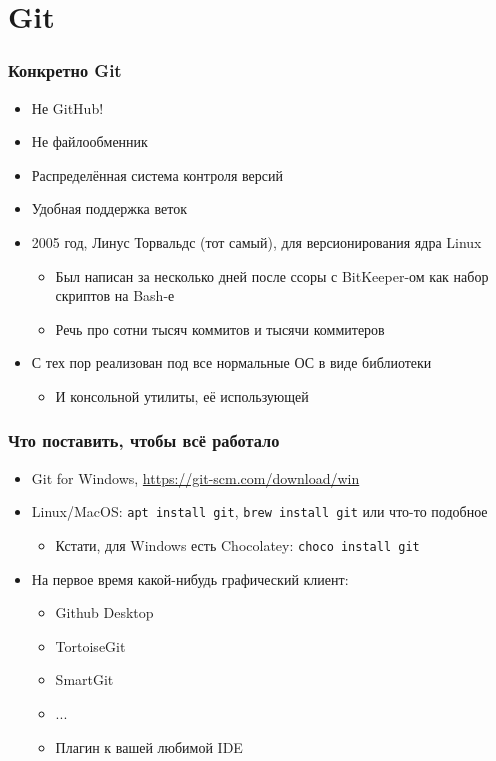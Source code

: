 \documentclass{../slides-style}
\begin{document}
    \section{Git}

    \begin{frame}
        \frametitle{Конкретно Git}
        \begin{itemize}
            \item Не GitHub!
            \item Не файлообменник
            \item Распределённая система контроля версий
            \item Удобная поддержка веток
            \item 2005 год, Линус Торвальдс (тот самый), для версионирования ядра Linux
            \begin{itemize}
                \item Был написан за несколько дней после ссоры с BitKeeper-ом как набор скриптов на Bash-е
                \item Речь про сотни тысяч коммитов и тысячи коммитеров
            \end{itemize}
            \item С тех пор реализован под все нормальные ОС в виде библиотеки 
            \begin{itemize}
                \item И консольной утилиты, её использующей
            \end{itemize} 
        \end{itemize}
    \end{frame}

    \begin{frame}[fragile]
        \frametitle{Что поставить, чтобы всё работало}
        \begin{itemize}
            \item Git for Windows, \url{https://git-scm.com/download/win}
            \item Linux/MacOS: \verb|apt install git|, \verb|brew install git| или что-то подобное
            \begin{itemize}
                \item Кстати, для Windows есть Chocolatey: \verb|choco install git|
            \end{itemize}
            \item На первое время какой-нибудь графический клиент:
            \begin{itemize}
                \item Github Desktop
                \item TortoiseGit
                \item SmartGit 
                \item ...
                \item Плагин к вашей любимой IDE
            \end{itemize}
        \end{itemize}
    \end{frame}
\end{document}
